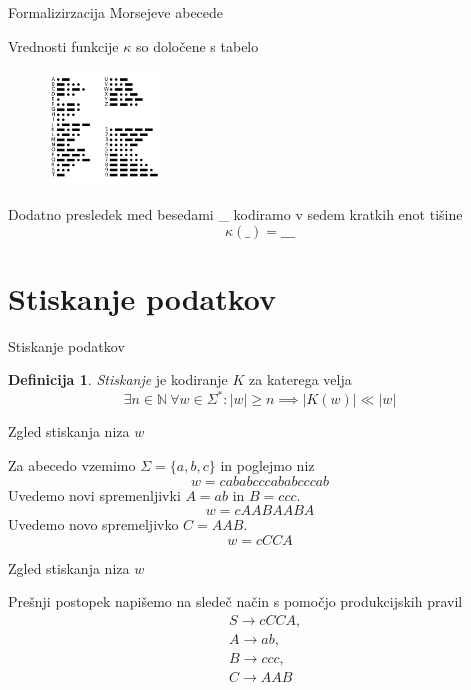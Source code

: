 \documentclass{beamer}
\newcommand{\N}{\mathbb{N}}
\theoremstyle{definition} %
\newtheorem{definicija}{Definicija}[section]
\theoremstyle{plain} %
\begin{document}
\begin{frame}{Formalizirzacija Morsejeve abecede}
    
    Vrednosti funkcije $ \kappa $ so določene s
    tabelo
    \begin{figure}[h]
        \centering
        \includegraphics[width=3cm]{International_Morse_Code.svg.png}
    \end{figure}
    Dodatno presledek med besedami \_  kodiramo v sedem kratkih enot tišine 
    \[
        \kappa(\_) = \_\_\_
    \]

\end{frame}

\section*{Stiskanje podatkov}

\begin{frame}{Stiskanje podatkov}
    
    \begin{definicija}
    
        \textit{Stiskanje} je kodiranje $ K $ za katerega velja 
        \[ 
        \exists n \in \N \ \forall w \in \Sigma^* \colon |w| \geq n \implies
        \left\lvert K(w)\right\rvert \ll \left\lvert w \right\rvert
        \]
    
    \end{definicija}

\end{frame}

\begin{frame}{Zgled stiskanja niza $ w $}

    Za abecedo vzemimo $ \Sigma = \{ a,b,c \} $ in poglejmo niz
    \[
        w = cababcccababcccab
    \]
    \pause
    Uvedemo novi spremenljivki $ A = ab $ in $ B = ccc $.
    \[
        w = cAABAABA
    \]
    \pause
    Uvedemo novo spremeljivko $ C = AAB $.    
    \[
        w = cCCA
    \]

\end{frame}

\begin{frame}{Zgled stiskanja niza $ w $}
    
    Prešnji postopek napišemo na sledeč način s pomočjo produkcijskih pravil
    \begin{align*}
        & S  \rightarrow  cCCA, \\
        & A  \rightarrow  ab, \\
        & B  \rightarrow  ccc, \\
        & C  \rightarrow  AAB
    \end{align*}

\end{frame}
\end{document}
